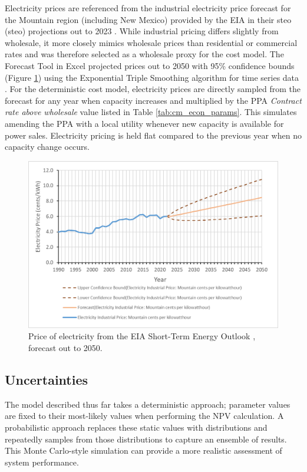 Electricity prices are referenced from the industrial electricity price forecast for the Mountain region (including New Mexico) provided by the EIA in their \acrlong{steo} (\acrshort{steo}) projections out to 2023 \citep{eia_short-term_2021}. While industrial pricing differs slightly from wholesale, it more closely mimics wholesale prices than residential or commercial rates and was therefore selected as a wholesale proxy for the cost model. The Forecast Tool in Excel projected prices out to 2050 with 95\% confidence bounds (Figure \ref{fig:electricity_pricing}) using the Exponential Triple Smoothing algorithm for time series data \citep{microsoft_forecastets_2021}. For the deterministic cost model, electricity prices are directly sampled from the forecast for any year when capacity increases and multiplied by the PPA \textit{Contract rate above wholesale} value listed in Table \ref{tab:cm_econ_params}. This simulates amending the PPA with a local utility whenever new capacity is available for power sales. Electricity pricing is held flat compared to the previous year when no capacity change occurs.

\begin{figure}[!htp]
\centering
\includegraphics[width=.8\textwidth]{templates/images/Figure-EIA_Electricity_Forecast.png}
\caption[Electricity price forecast]{Price of electricity from the EIA Short-Term Energy Outlook \protect\citep{eia_short-term_2021}, forecast out to 2050.}
\label{fig:electricity_pricing}
\end{figure}

\subsection{Uncertainties}
\label{ch4:cm_uncertainties}

The model described thus far takes a deterministic approach; parameter values are fixed to their most-likely values when performing the NPV calculation. A probabilistic approach replaces these static values with distributions and repeatedly samples from those distributions to capture an ensemble of results. This Monte Carlo-style simulation can provide a more realistic assessment of system performance.

